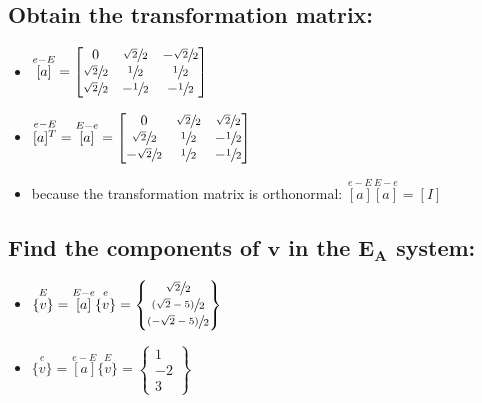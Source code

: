 \documentclass[10pt, letterpaper]{article}
\begin{document}
	\subsection{Obtain the transformation matrix:}
		\begin{itemize}
			\item $\overset{e -E}{[a]} = \begin{bmatrix}
						0	&	\sfrac{\sqrt{2}}{2}	&	-\sfrac{\sqrt{2}}{2} \\
						\sfrac{\sqrt{2}}{2}	&	\sfrac{1}{2}		& 	\sfrac{1}{2} \\
						\sfrac{\sqrt{2}}{2}	&	-\sfrac{1}{2}	&	-\sfrac{1}{2}
						\end{bmatrix}$
						
			\item $\overset{e- E}{[a]^T} =\overset{E- e}{[a]}= \begin{bmatrix}
						0	&	\sfrac{\sqrt{2}}{2}	&	\sfrac{\sqrt{2}}{2} \\
						\sfrac{\sqrt{2}}{2}	&	\sfrac{1}{2}		& 	-\sfrac{1}{2} \\
						-\sfrac{\sqrt{2}}{2}	&	\sfrac{1}{2}	&	-\sfrac{1}{2}
						\end{bmatrix}$
			
			\item because the transformation matrix is orthonormal: $\overset{e -E}{[a]} \overset{E- e}{[a]}= [I]$
		\end{itemize}
	\subsection{Find the components of $\bm{v}$ in the $\bm{E_A}$ system:}
		\begin{itemize}
			\item $\overset{E}{\{v\}} =  \overset{E- e}{[a]} \overset{e}{\{v\}} = \begin{Bmatrix}
				\sfrac{\sqrt{2}}{2} \\ \sfrac{(\sqrt{2} - 5)}{2} \\ \sfrac{(-\sqrt{2}-5)}{2}	
				\end{Bmatrix}$
				
			\item $\overset{e}{\{v\}} = \overset{e -E}{[a]}\overset{E}{\{v\}} = \begin{Bmatrix}
				1 \\ -2 \\ 3	
				\end{Bmatrix}$
		\end{itemize}
		
\end{document}
